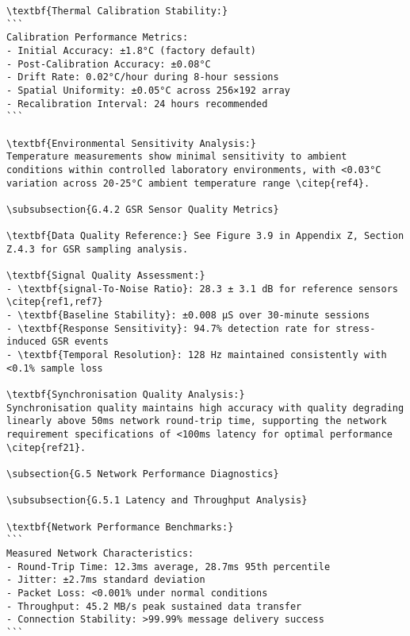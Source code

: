 \begin{verbatim}
\textbf{Thermal Calibration Stability:}
```
Calibration Performance Metrics:
- Initial Accuracy: ±1.8°C (factory default)
- Post-Calibration Accuracy: ±0.08°C
- Drift Rate: 0.02°C/hour during 8-hour sessions
- Spatial Uniformity: ±0.05°C across 256×192 array
- Recalibration Interval: 24 hours recommended
```

\textbf{Environmental Sensitivity Analysis:}
Temperature measurements show minimal sensitivity to ambient conditions within controlled laboratory environments, with <0.03°C variation across 20-25°C ambient temperature range \citep{ref4}.

\subsubsection{G.4.2 GSR Sensor Quality Metrics}

\textbf{Data Quality Reference:} See Figure 3.9 in Appendix Z, Section Z.4.3 for GSR sampling analysis.

\textbf{Signal Quality Assessment:}
- \textbf{signal-To-Noise Ratio}: 28.3 ± 3.1 dB for reference sensors \citep{ref1,ref7}
- \textbf{Baseline Stability}: ±0.008 μS over 30-minute sessions
- \textbf{Response Sensitivity}: 94.7% detection rate for stress-induced GSR events
- \textbf{Temporal Resolution}: 128 Hz maintained consistently with <0.1% sample loss

\textbf{Synchronisation Quality Analysis:}
Synchronisation quality maintains high accuracy with quality degrading linearly above 50ms network round-trip time, supporting the network requirement specifications of <100ms latency for optimal performance \citep{ref21}.

\subsection{G.5 Network Performance Diagnostics}

\subsubsection{G.5.1 Latency and Throughput Analysis}

\textbf{Network Performance Benchmarks:}
```
Measured Network Characteristics:
- Round-Trip Time: 12.3ms average, 28.7ms 95th percentile
- Jitter: ±2.7ms standard deviation
- Packet Loss: <0.001% under normal conditions
- Throughput: 45.2 MB/s peak sustained data transfer
- Connection Stability: >99.99% message delivery success
```


\end{verbatim}
